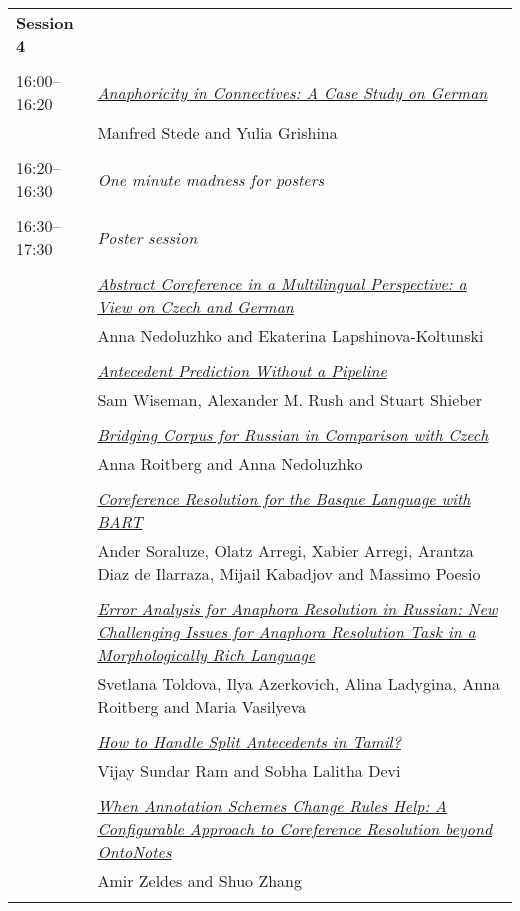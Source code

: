 \begin{tabular}{p{20mm}p{128mm}}
{\bf Session 4} \\
\\
16:00--16:20 & \hyperlink{page.41}{\em Anaphoricity in Connectives: A Case Study on German}\\
         & Manfred Stede and Yulia Grishina \\
\\

16:20--16:30 & {\em One minute madness for posters} \\
\\
16:30--17:30 & {\em Poster session} \\
\\
 & \hyperlink{page.47}{\em Abstract Coreference in a Multilingual Perspective: a View on Czech and German}\\
         & Anna Nedoluzhko and Ekaterina Lapshinova-Koltunski \\
\\

 & \hyperlink{page.53}{\em Antecedent Prediction Without a Pipeline}\\
         & Sam Wiseman, Alexander M. Rush and Stuart Shieber \\
\\

 & \hyperlink{page.59}{\em Bridging Corpus for Russian in Comparison with Czech}\\
         & Anna Roitberg and Anna Nedoluzhko \\
\\

 & \hyperlink{page.67}{\em Coreference Resolution for the Basque Language with BART}\\
         & Ander Soraluze, Olatz Arregi, Xabier Arregi, Arantza Diaz de Ilarraza, Mijail Kabadjov and Massimo Poesio \\
\\

 & \hyperlink{page.74}{\em Error Analysis for Anaphora Resolution in Russian: New Challenging Issues for Anaphora Resolution Task in a Morphologically Rich Language}\\
         & Svetlana Toldova, Ilya Azerkovich, Alina Ladygina, Anna Roitberg and Maria Vasilyeva \\
\\

 & \hyperlink{page.84}{\em How to Handle Split Antecedents in Tamil?}\\
         & Vijay Sundar Ram and Sobha Lalitha Devi \\
\\

 & \hyperlink{page.92}{\em When Annotation Schemes Change Rules Help: A Configurable Approach to Coreference Resolution beyond OntoNotes}\\
         & Amir Zeldes and Shuo Zhang \\
\\


\end{tabular}
